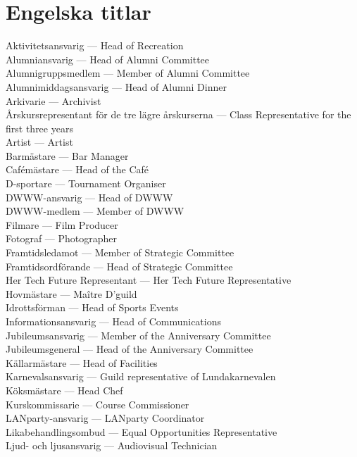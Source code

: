\documentclass{dsekkallelse}
\begin{document}
\section{Engelska titlar}
Aktivitetsansvarig ---	Head of Recreation \\
Alumniansvarig ---	Head of Alumni Committee\\
Alumnigruppsmedlem ---	Member of Alumni Committee\\
Alumnimiddagsansvarig ---	Head of Alumni Dinner\\
Arkivarie ---	Archivist\\
Årskursrepresentant för de tre lägre årskurserna ---	Class Representative for the first three years\\
Artist ---	Artist\\
Barmästare ---	Bar Manager\\
Cafémästare ---	Head of the Café\\
D-sportare --- Tournament Organiser \\
DWWW-ansvarig ---	Head of DWWW\\
DWWW-medlem ---	Member of DWWW\\
Filmare --- Film Producer \\
Fotograf ---	Photographer\\
Framtidsledamot ---	Member of Strategic Committee\\
Framtidsordförande ---	Head of Strategic Committee\\
Her Tech Future Representant ---	Her Tech Future Representative\\
Hovmästare ---	Maître D'guild\\
Idrottsförman ---	Head of Sports Events\\
Informationsansvarig ---	Head of Communications\\
Jubileumsansvarig ---	Member of the Anniversary Committee\\
Jubileumsgeneral ---	Head of the Anniversary Committee\\
Källarmästare ---	Head of Facilities\\
Karnevalsansvarig ---	Guild representative of Lundakarnevalen\\
Köksmästare ---	Head Chef\\
Kurskommissarie ---	Course Commissioner\\
LANparty-ansvarig ---	LANparty Coordinator\\
Likabehandlingsombud ---	Equal Opportunities Representative\\
Ljud- och ljusansvarig ---	Audiovisual Technician\\
\end{document}
